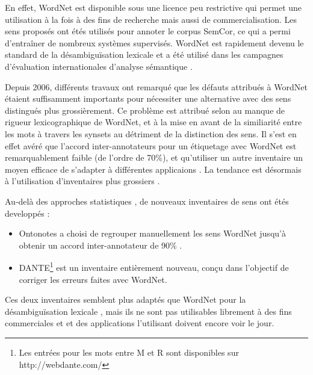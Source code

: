 En effet, WordNet est disponible sous une licence peu restrictive qui permet
une utilisation à la fois à des fins de recherche mais aussi de
commercialisation. Les sens proposés ont étés utilisés pour annoter le corpus
SemCor, ce qui a permi d'entraîner de nombreux systèmes supervisés. WordNet est
rapidement devenu le standard de la désambiguïsation lexicale et a été utilisé
dans les campagnes d'évaluation internationales d'analyse sémantique
\citep{navigli2009word}.

Depuis 2006, différents travaux \citep{navigli2007semeval,hovy2006ontonotes}
ont remarqué que les défauts attribués à WordNet
\citep{snow2007learning,ide2007making} étaient suffisamment importants pour
nécessiter une alternative avec des sens distingués plus grossièrement. Ce
problème est attribué selon \cite{edmonds2002introduction} au manque de rigueur
lexicographique de WordNet, et à la mise en avant de la similiarité entre les
mots à travers les synsets au détriment de la distinction des sens. Il s'est en
effet avéré que l'accord inter-annotateurs pour un étiquetage avec WordNet est
remarquablement faible (de l'ordre de 70\%), et qu'utiliser un autre inventaire
un moyen efficace de s'adapter à différentes applicaions
\citep{palmer2004different}. La tendance est désormais à l'utilisation
d'inventaires plus grossiers \citep{navigli2007semeval,navigli2012quick}.

Au-delà des approches statistiques \citep{snow2007learning}, de nouveaux
inventaires de sens ont étés developpés :

\begin{itemize}

    \item Ontonotes \citep{hovy2006ontonotes} a choisi de regrouper
        manuellement les sens WordNet jusqu'à obtenir un accord
        inter-annotateur de 90\% .

    \item DANTE\footnote{Les entrées pour les mots entre M et R sont
        disponibles sur http://webdante.com/} \citep{mccarthy2010dante} est un
        inventaire entièrement nouveau, conçu dans l'objectif de corriger les
        erreurs faites avec WordNet\citep{kilgarriff2010detailed}.

\end{itemize}

Ces deux inventaires semblent plus adaptés que WordNet pour la désambiguïsation
lexicale \citep{navigli2012quick}, mais ils ne sont pas utilisables librement à
des fins commerciales et et des applications l'utilisant doivent encore voir le
jour.


